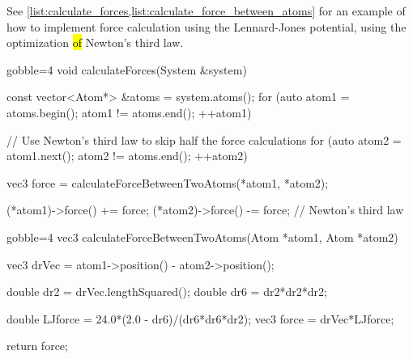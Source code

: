 See \cref{list:calculate_forces,list:calculate_force_between_atoms} for an example of how to implement force calculation using the Lennard-Jones potential, using the optimization \hl{of} Newton's third law.
%
\begin{listing}[!htb]%
%                 
\begin{cppcode*}{gobble=4}
    void calculateForces(System &system) {
        const vector<Atom*> &atoms = system.atoms();
        for (auto atom1 = atoms.begin(); atom1 != atoms.end(); ++atom1) {
        
            // Use Newton's third law to skip half the force calculations
            for (auto atom2 = atom1.next(); atom2 != atoms.end(); ++atom2) {
                vec3 force = calculateForceBetweenTwoAtoms(*atom1, *atom2);
                
                (*atom1)->force() += force;
                (*atom2)->force() -= force; // Newton's third law
            }
        }
    }
\end{cppcode*}
\caption{%
    Implementation of  from \cref{list:simple_md_program}.%
    \label{list:calculate_forces}%
}%
\end{listing}%
%
\begin{listing}[!htb]%
\begin{cppcode*}{gobble=4}
    vec3 calculateForceBetweenTwoAtoms(Atom *atom1, Atom *atom2) {
        vec3 drVec = atom1->position() - atom2->position();
        
        double dr2 = drVec.lengthSquared();
        double dr6 = dr2*dr2*dr2;

        double LJforce = 24.0*(2.0 - dr6)/(dr6*dr6*dr2);
        vec3 force = drVec*LJforce;
        
        return force;
    }
\end{cppcode*}
\caption{%
    Implementation of  from \cref{list:calculate_forces}.%
    \label{list:calculate_force_between_atoms}%
}%
\end{listing}%

